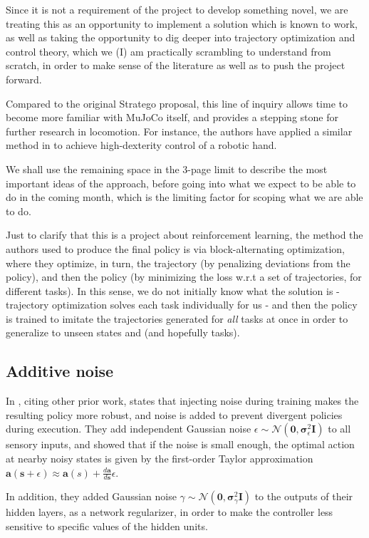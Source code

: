 \documentclass{article}
\newcommand{\bvec}[1]{\boldsymbol{#1}}
\begin{document}
Since it is not a requirement of the project to develop something novel, we are treating this as an opportunity to implement a solution which is known to work, as well as taking the opportunity to dig deeper into trajectory optimization and control theory, which we (I) am practically scrambling to understand from scratch, in order to make sense of the literature as well as to push the project forward.

Compared to the original Stratego proposal, this line of inquiry allows time to become more familiar with MuJoCo itself, and provides a stepping stone for further research in locomotion. For instance, the authors have applied a similar method in \cite{mordatch2012contact} to achieve high-dexterity control of a robotic hand.

We shall use the remaining space in the 3-page limit to describe the most important ideas of the approach, before going into what we expect to be able to do in the coming month, which is the limiting factor for scoping what we are able to do.

Just to clarify that this is a project about reinforcement learning, the method the authors used to produce the final policy is via block-alternating optimization, where they optimize, in turn, the trajectory (by penalizing deviations from the policy), and then the policy (by minimizing the loss w.r.t a set of trajectories, for different tasks). In this sense, we do not initially know what the solution is - trajectory optimization solves each task individually for us - and then the policy is trained to imitate the trajectories generated for \textit{all} tasks at once in order to generalize to unseen states and (and hopefully tasks).

\subsection{Additive noise}
In \cite{mordatch2015interactive}, citing other prior work, states that injecting noise during training makes the resulting policy more robust, and noise is added to prevent divergent policies during execution. They add independent Gaussian noise $\epsilon \sim \mathcal{N}(\bvec{0}, \bvec{\sigma}^2_{\epsilon}\bvec{I})$ to all sensory inputs, and showed that if the noise is small enough, the optimal action at nearby noisy states is given by the first-order Taylor approximation $\bvec{a}(\bvec{s}+\epsilon) \approx \bvec{a}(s) + \frac{d\bvec{a}}{d\bvec{s}}\epsilon$.

In addition, they added Gaussian noise $\gamma \sim \mathcal{N}(\bvec{0}, \bvec{\sigma}^2_{\gamma}\bvec{I})$ to the outputs of their hidden layers, as a network regularizer, in order to make the controller less sensitive to specific values of the hidden units.
\end{document}
